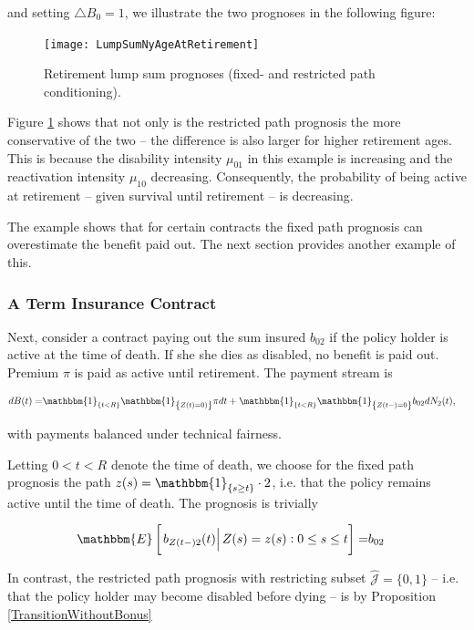 \documentclass{article}
\newcommand{\1}[1]{\mathbbm{1}_{\left\lbrace #1 \right\rbrace}}
\newcommand{\econd}[2][def]{\mathbbm{E} \left[ \left. #1 \right| #2 \right]}
\theoremstyle{break}
\theoremstyle{remark}
\numberwithin{equation}{section}
\begin{document}
and setting $\triangle B_0=1$, we illustrate the two prognoses in the following figure:

\begin{figure}[H]
	\centering
	\caption{Retirement lump sum prognoses (fixed- and restricted path conditioning).}
	\texttt{[image: LumpSumNyAgeAtRetirement]} \label{LumpFigure}
\end{figure}

Figure \ref{LumpFigure} shows that not only is the restricted path prognosis the more conservative of the two -- the difference is also larger for higher retirement ages. This is because the disability intensity $\mu_{01}$ in this example is increasing and the reactivation intensity $\mu_{10}$ decreasing. Consequently, the probability of being active at retirement -- given survival until retirement -- is decreasing.

The example shows that for certain contracts the fixed path prognosis can overestimate the benefit paid out. The next section provides another example of this.

\subsubsection{A Term Insurance Contract}

Next, consider a contract paying out the sum insured $b_{02}$ if the policy holder is active at the time of death. If she she dies as disabled, no benefit is paid out. Premium $\pi$ is paid as active until retirement. The payment stream is

\begin{align*}
	dB(t) =& \1{t<R} \1{Z(t)=0)} \pi dt + \1{t<R} \1{Z(t-)=0} b_{02} d N_2(t),
\end{align*}

with payments balanced under technical fairness.

Letting $0<t<R$ denote the time of death, we choose for the fixed path prognosis the path $z(s) = \1{s \geq t} \cdot 2$, i.e. that the policy remains active until the time of death. The prognosis is trivially

\begin{align} \label{Fixed2}
	\econd[b_{Z(t-)2}(t)]{ Z(s) = z(s) : 0 \leq s \leq t} =& b_{02}
\end{align}

In contrast, the restricted path prognosis with restricting subset $\hat{\mathcal{J}} = \{ 0,1 \}$ -- i.e. that the policy holder may become disabled before dying -- is by Proposition \ref{TransitionWithoutBonus}
\end{document}
